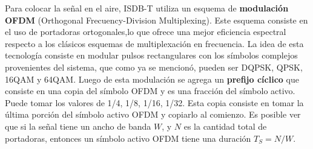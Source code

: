 \documentclass[journal,comsoc]{IEEEtran}
\begin{document}
Para colocar la señal en el aire, ISDB-T utiliza un esquema de \textbf{modulación OFDM} \cite{chang-ofdm} (Orthogonal Frecuency-Division Multiplexing). Este esquema consiste en el uso de portadoras ortogonales,lo que ofrece una mejor eficiencia espectral respecto a los clásicos esquemas de multiplexación en frecuencia.
La idea de esta tecnología consiste en modular pulsos rectangulares con los símbolos complejos provenientes del sistema, que como ya se mencionó, pueden ser DQPSK, QPSK, 16QAM y 64QAM. Luego de esta modulación se agrega un \textbf{prefijo cíclico} que consiste en una copia del símbolo OFDM y es una fracción del símbolo activo. Puede tomar los valores de 1/4, 1/8, 1/16, 1/32. Esta copia consiste en tomar la última porción del símbolo activo OFDM y copiarlo al comienzo.  Es posible ver que si la señal tiene un ancho de banda $W$, y $N$ es la cantidad total de portadoras, entonces un símbolo activo OFDM tiene una duración $T_S = N/W$\cite{chang-ofdm}.
\end{document}
